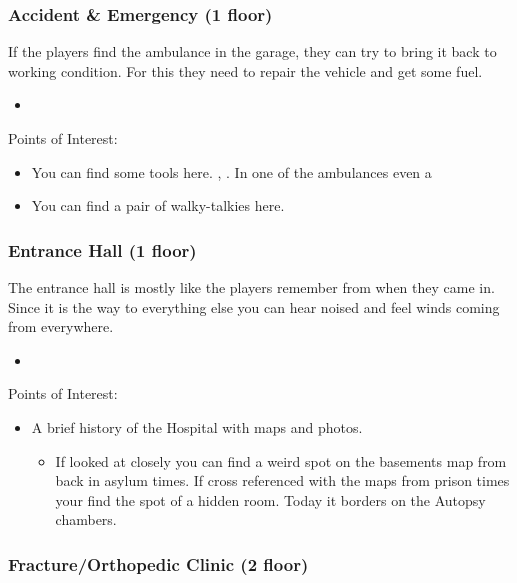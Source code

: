 \documentclass[11pt]{article}
\begin{document}
{\subsubsection{Accident \& Emergency (1 floor)}
\label{sec:orgac60382}

If the players find the ambulance in the garage, they can try to bring it back to working condition. For this they need to repair the vehicle and get some fuel.

\begin{itemize}
\item {}
\end{itemize}

Points of Interest:
\begin{itemize}
\item You can find some tools here. , . In one of the ambulances even a 
\item You can find a pair of walky-talkies here.
\end{itemize}
\subsubsection{Entrance Hall (1 floor)}
\label{sec:org5d6fe94}

The entrance hall is mostly like the players remember from when they came in. Since it is the way to everything else you can hear noised and feel winds coming from everywhere.

\begin{itemize}
\item {}
\end{itemize}


Points of Interest:
\begin{itemize}
\item A brief history of the Hospital with maps and photos.
\begin{itemize}
\item If looked at closely you can find a weird spot on the basements map from back in asylum times.
If cross referenced with the maps from prison times your find the spot of a hidden room. Today it borders on the Autopsy chambers.
\end{itemize}
\end{itemize}
\subsubsection{Fracture/Orthopedic Clinic (2 floor)}
\label{sec:org69082af}

}
\end{document}

